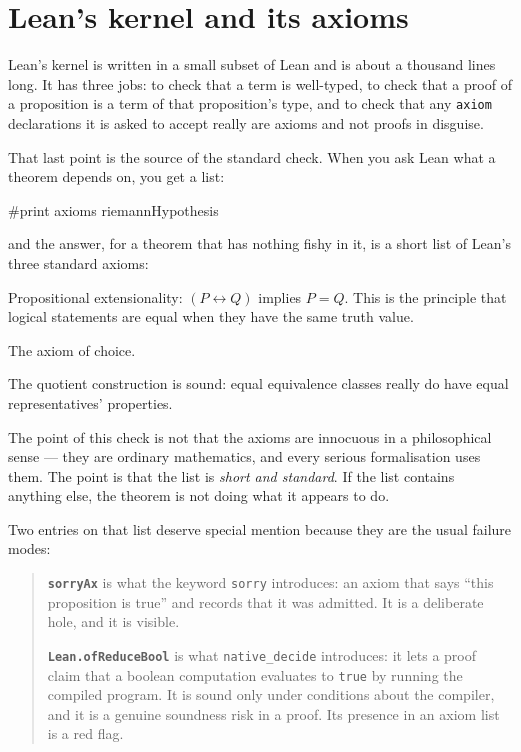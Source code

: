 \section{Lean's kernel and its axioms}Lean's kernel is written in a small subset of Lean and is about a thousand
lines long. It has three jobs: to check that a term is well-typed, to check that
a proof of a proposition is a term of that proposition's type, and to check
that any \texttt{axiom} declarations it is asked to accept really are axioms
and not proofs in disguise.

That last point is the source of the standard check. When you ask Lean what a
theorem depends on, you get a list:

\begin{leanquote}
#print axioms riemannHypothesis
\end{leanquote}

and the answer, for a theorem that has nothing fishy in it, is a short list of
Lean's three standard axioms:

\begin{description}[style=nextline,leftmargin=0pt,labelwidth=0pt,labelsep=0pt,font=\sffamily\bfseries\small,
  itemsep=5pt]
\item[\texttt{propext}\idx{propext}] Propositional extensionality: $(P \leftrightarrow Q)$
implies $P = Q$. This is the principle that logical statements are equal when
they have the same truth value.
\item[\texttt{Classical.choice}\idx{Classical.choice}] The axiom of choice.
\item[\texttt{Quot.sound}\idx{Quot.sound}] The quotient construction is sound: equal
equivalence classes really do have equal representatives' properties.
\end{description}

The point of this check is not that the axioms are innocuous in a philosophical
sense --- they are ordinary mathematics, and every serious formalisation uses
them. The point is that the list is \emph{short and standard}. If the list
contains anything else, the theorem is not doing what it appears to do.

Two entries on that list deserve special mention because they are the usual
failure modes:

\begin{quote}
\textbf{\texttt{sorryAx}} is what the keyword \texttt{sorry} introduces: an
axiom that says ``this proposition is true'' and records that it was admitted.
It is a deliberate hole, and it is visible.

\textbf{\texttt{Lean.ofReduceBool}} is what \texttt{native\_decide} introduces:
it lets a proof claim that a boolean computation evaluates to \texttt{true} by
running the compiled program. It is sound only under conditions about the
compiler, and it is a genuine soundness risk in a proof. Its presence in an
axiom list is a red flag.
\end{quote}

